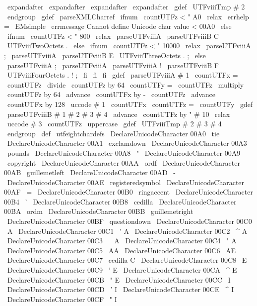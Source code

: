 {{{{{\
expandafter
\
expandafter
\
expandafter
\
expandafter
\
gdef
\
UTFviiiTmp
{
#
2
}
%
\
endgroup
}
\
gdef
\
parseXMLCharref
{
%
\
ifnum
\
countUTFz
<
"
A0
\
relax
\
errhelp
=
\
EMsimple
\
errmessage
{
Cannot
define
Unicode
char
value
<
00A0
}
%
\
else
\
ifnum
\
countUTFz
<
"
800
\
relax
\
parseUTFviiiA
%
\
parseUTFviiiB
C
\
UTFviiiTwoOctets
.
%
\
else
\
ifnum
\
countUTFz
<
"
10000
\
relax
\
parseUTFviiiA
;
%
\
parseUTFviiiA
%
\
parseUTFviiiB
E
\
UTFviiiThreeOctets
.
{
;
}
%
\
else
\
parseUTFviiiA
;
%
\
parseUTFviiiA
%
\
parseUTFviiiA
!
%
\
parseUTFviiiB
F
\
UTFviiiFourOctets
.
{
!
;
}
%
\
fi
\
fi
\
fi
}
\
gdef
\
parseUTFviiiA
#
1
{
%
\
countUTFx
=
\
countUTFz
\
divide
\
countUTFz
by
64
\
countUTFy
=
\
countUTFz
\
multiply
\
countUTFz
by
64
\
advance
\
countUTFx
by
-
\
countUTFz
\
advance
\
countUTFx
by
128
\
uccode
#
1
\
countUTFx
\
countUTFz
=
\
countUTFy
}
\
gdef
\
parseUTFviiiB
#
1
#
2
#
3
#
4
{
%
\
advance
\
countUTFz
by
"
#
10
\
relax
\
uccode
#
3
\
countUTFz
\
uppercase
{
\
gdef
\
UTFviiiTmp
{
#
2
#
3
#
4
}
}
}
\
endgroup
\
def
\
utfeightchardefs
{
%
\
DeclareUnicodeCharacter
{
00A0
}
{
\
tie
}
\
DeclareUnicodeCharacter
{
00A1
}
{
\
exclamdown
}
\
DeclareUnicodeCharacter
{
00A3
}
{
\
pounds
}
\
DeclareUnicodeCharacter
{
00A8
}
{
\
"
{
}
}
\
DeclareUnicodeCharacter
{
00A9
}
{
\
copyright
}
\
DeclareUnicodeCharacter
{
00AA
}
{
\
ordf
}
\
DeclareUnicodeCharacter
{
00AB
}
{
\
guillemetleft
}
\
DeclareUnicodeCharacter
{
00AD
}
{
\
-
}
\
DeclareUnicodeCharacter
{
00AE
}
{
\
registeredsymbol
}
\
DeclareUnicodeCharacter
{
00AF
}
{
\
=
{
}
}
\
DeclareUnicodeCharacter
{
00B0
}
{
\
ringaccent
{
}
}
\
DeclareUnicodeCharacter
{
00B4
}
{
\
'
{
}
}
\
DeclareUnicodeCharacter
{
00B8
}
{
\
cedilla
{
}
}
\
DeclareUnicodeCharacter
{
00BA
}
{
\
ordm
}
\
DeclareUnicodeCharacter
{
00BB
}
{
\
guillemetright
}
\
DeclareUnicodeCharacter
{
00BF
}
{
\
questiondown
}
\
DeclareUnicodeCharacter
{
00C0
}
{
\
A
}
\
DeclareUnicodeCharacter
{
00C1
}
{
\
'
A
}
\
DeclareUnicodeCharacter
{
00C2
}
{
\
^
A
}
\
DeclareUnicodeCharacter
{
00C3
}
{
\
~
A
}
\
DeclareUnicodeCharacter
{
00C4
}
{
\
"
A
}
\
DeclareUnicodeCharacter
{
00C5
}
{
\
AA
}
\
DeclareUnicodeCharacter
{
00C6
}
{
\
AE
}
\
DeclareUnicodeCharacter
{
00C7
}
{
\
cedilla
{
C
}
}
\
DeclareUnicodeCharacter
{
00C8
}
{
\
E
}
\
DeclareUnicodeCharacter
{
00C9
}
{
\
'
E
}
\
DeclareUnicodeCharacter
{
00CA
}
{
\
^
E
}
\
DeclareUnicodeCharacter
{
00CB
}
{
\
"
E
}
\
DeclareUnicodeCharacter
{
00CC
}
{
\
I
}
\
DeclareUnicodeCharacter
{
00CD
}
{
\
'
I
}
\
DeclareUnicodeCharacter
{
00CE
}
{
\
^
I
}
\
DeclareUnicodeCharacter
{
00CF
}
{
\
"
I
}
\
}}}}}
